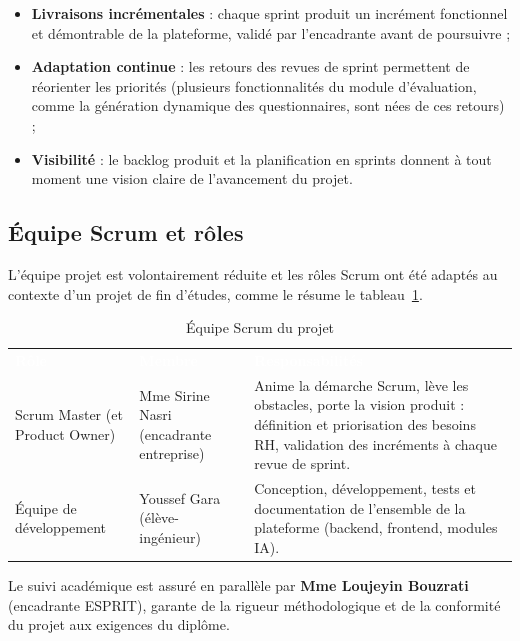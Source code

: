 \documentclass[12pt,a4paper]{report}
\begin{document}
\begin{itemize}
  \item \textbf{Livraisons incrémentales} : chaque sprint produit un incrément fonctionnel et démontrable de la plateforme, validé par l'encadrante avant de poursuivre ;
  \item \textbf{Adaptation continue} : les retours des revues de sprint permettent de réorienter les priorités (plusieurs fonctionnalités du module d'évaluation, comme la génération dynamique des questionnaires, sont nées de ces retours) ;
  \item \textbf{Visibilité} : le backlog produit et la planification en sprints donnent à tout moment une vision claire de l'avancement du projet.
\end{itemize}

\subsection{Équipe Scrum et rôles}

L'équipe projet est volontairement réduite et les rôles Scrum ont été adaptés au contexte d'un projet de fin d'études, comme le résume le tableau~\ref{tab:equipe-scrum}.

\begin{table}[H]
\centering
\caption{Équipe Scrum du projet}
\label{tab:equipe-scrum}
\small
\begin{tabularx}{\textwidth}{p{3.5cm} p{3.5cm} X}
\rowcolor{tabheader}
\textcolor{white}{\textbf{Rôle}} & \textcolor{white}{\textbf{Membre}} & \textcolor{white}{\textbf{Responsabilités}} \\
Scrum Master \newline (et Product Owner) & Mme Sirine Nasri \newline (encadrante entreprise) & Anime la démarche Scrum, lève les obstacles, porte la vision produit : définition et priorisation des besoins RH, validation des incréments à chaque revue de sprint. \\
\rowcolor{tabalt}
Équipe de développement & Youssef Gara \newline (élève-ingénieur) & Conception, développement, tests et documentation de l'ensemble de la plateforme (backend, frontend, modules IA). \\
\bottomrule
\end{tabularx}
\end{table}

Le suivi académique est assuré en parallèle par \textbf{Mme Loujeyin Bouzrati} (encadrante ESPRIT), garante de la rigueur méthodologique et de la conformité du projet aux exigences du diplôme.
\end{document}
